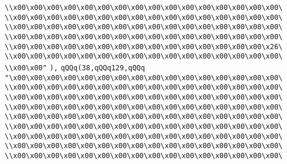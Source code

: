 \verb|\\x00\x00\x00\x00\x00\x00\x00\x00\x00\x00\x00\x00\x00\x00\x00\x00\|\newline
\verb|\\x00\x00\x00\x00\x00\x00\x00\x00\x00\x00\x00\x00\x00\x00\x00\x00\|\newline
\verb|\\x00\x00\x00\x00\x00\x00\x00\x00\x00\x00\x00\x00\x00\x00\x00\x00\|\newline
\verb|\\x00\x00\x00\x00\x00\x00\x00\x00\x00\x00\x00\x00\x00\x00\x00\x00\|\newline
\verb|\\x00\x00\x00\x00\x00\x00\x00\x00\x00\x00\x00\x00\x00\x00\x00\x26\|\newline
\verb|\\x00\x00\x00\x00\x00\x00\x00\x00\x00\x00\x00\x00\x00\x00\x00\x00\|\newline
\verb|\\x00\x00"|\newline
\verb|),|\newline
\verb|qQQq(38,qQQq129,qQQq|\newline
\verb|"\x00\x00\x00\x00\x00\x00\x00\x00\x00\x00\x00\x00\x00\x00\x00\x00\|\newline
\verb|\\x00\x00\x00\x00\x00\x00\x00\x00\x00\x00\x00\x00\x00\x00\x00\x00\|\newline
\verb|\\x00\x00\x00\x00\x00\x00\x00\x00\x00\x00\x00\x00\x00\x00\x00\x00\|\newline
\verb|\\x00\x00\x00\x00\x00\x00\x00\x00\x00\x00\x00\x00\x00\x00\x00\x00\|\newline
\verb|\\x00\x00\x00\x00\x00\x00\x00\x00\x00\x00\x00\x00\x00\x00\x00\x00\|\newline
\verb|\\x00\x00\x00\x00\x00\x00\x00\x00\x00\x00\x00\x00\x00\x00\x00\x00\|\newline
\verb|\\x00\x00\x00\x00\x00\x00\x00\x00\x00\x00\x00\x00\x00\x00\x00\x00\|\newline
\verb|\\x00\x00\x00\x00\x00\x00\x00\x00\x00\x00\x00\x00\x00\x00\x00\x00\|\newline
\verb|\\x00\x00\x00\x00\x00\x00\x00\x00\x00\x00\x00\x00\x00\x00\x00\x00\|\newline
